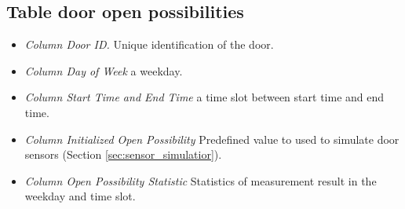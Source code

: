 \subsection*{Table door open possibilities}
\begin{itemize}
    \item \textsl{Column Door ID.} Unique identification of the door. 
    \item \textsl{Column Day of Week} a weekday.
    \item \textsl{Column Start Time and End Time} a time slot between start time and end time.
    \item \textsl{Column Initialized Open Possibility} Predefined value to used to simulate door sensors (Section \ref{sec:sensor_simulatior}).
    \item \textsl{Column Open Possibility Statistic} Statistics of measurement result in the weekday and time slot.
    \begin{table}[htb]
    \centering
    \caption{Door Open Possibility}
    \label{tab:db_open_possibilities}
    \end{table}
\end{itemize}


